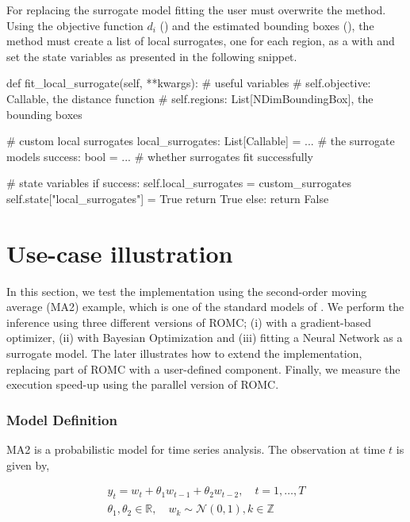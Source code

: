 \documentclass[article]{jss}
\newcommand{\R}{\mathbb{R}}
\begin{document}
For replacing the surrogate model fitting the user must overwrite the
 method. Using the objective function
\(d_i\) () and the estimated bounding boxes
(), the method must create a list of local
surrogates, one for each region, as a  with
 and set the state variables as presented in the
following snippet.

\begin{Code}
def fit_local_surrogate(self, **kwargs):
    # useful variables
    # self.objective: Callable, the distance function
    # self.regions: List[NDimBoundingBox], the bounding boxes

    # custom local surrogates
    local_surrogates: List[Callable] = ... # the surrogate models
    success: bool = ... # whether surrogates fit successfully

    # state variables
    if success:
        self.local_surrogates = custom_surrogates
        self.state["local_surrogates"] = True
        return True
    else:
        return False
\end{Code}


\section{Use-case illustration}

In this section, we test the implementation using the second-order
moving average (MA2) example, which is one of the standard models of
. We perform the inference using three different versions of
ROMC; (i) with a gradient-based optimizer, (ii) with Bayesian
Optimization and (iii) fitting a Neural Network as a surrogate
model. The later illustrates how to extend the implementation,
replacing part of ROMC with a user-defined component. Finally, we
measure the execution speed-up using the parallel version of ROMC.

\subsubsection*{Model Definition}

MA2 is a probabilistic model for time series analysis. The observation
at time \(t\) is given by,

\begin{gather} \label{eq:ma2}
y_t = w_t + \theta_1 w_{t-1} + \theta_2 w_{t-2}, \quad t=1, \ldots, T\\
\theta_1, \theta_2 \in \R, \quad  w_k \sim \mathcal{N}(0,1), k \in \mathbb{Z}
\end{gather}
\end{document}
